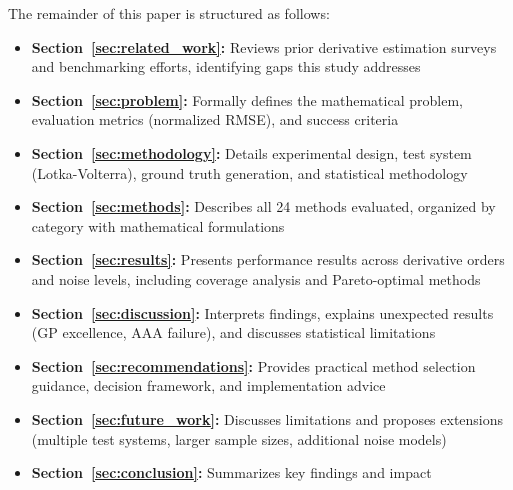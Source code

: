 The remainder of this paper is structured as follows:

\begin{itemize}
    \item \textbf{Section~\ref{sec:related_work}:} Reviews prior derivative estimation surveys and benchmarking efforts, identifying gaps this study addresses
    \item \textbf{Section~\ref{sec:problem}:} Formally defines the mathematical problem, evaluation metrics (normalized RMSE), and success criteria
    \item \textbf{Section~\ref{sec:methodology}:} Details experimental design, test system (Lotka-Volterra), ground truth generation, and statistical methodology
    \item \textbf{Section~\ref{sec:methods}:} Describes all 24 methods evaluated, organized by category with mathematical formulations
    \item \textbf{Section~\ref{sec:results}:} Presents performance results across derivative orders and noise levels, including coverage analysis and Pareto-optimal methods
    \item \textbf{Section~\ref{sec:discussion}:} Interprets findings, explains unexpected results (GP excellence, AAA failure), and discusses statistical limitations
    \item \textbf{Section~\ref{sec:recommendations}:} Provides practical method selection guidance, decision framework, and implementation advice
    \item \textbf{Section~\ref{sec:future_work}:} Discusses limitations and proposes extensions (multiple test systems, larger sample sizes, additional noise models)
    \item \textbf{Section~\ref{sec:conclusion}:} Summarizes key findings and impact
\end{itemize}
